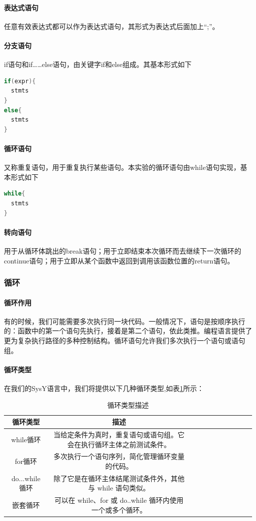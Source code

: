 \documentclass[UTF8,a4paper,10pt]{ctexart}
\begin{document}
\paragraph{表达式语句} 任意有效表达式都可以作为表达式语句，其形式为表达式后面加上“;”。
\paragraph{分支语句} if语句和if……else语句，由关键字if和else组成。其基本形式如下
\begin{lstlisting}[language = c++]
if(expr){
  stmts
}
else{
  stmts
}
\end{lstlisting}
\paragraph{循环语句} 又称重复语句，用于重复执行某些语句。本实验的循环语句由while语句实现，基本形式如下
\begin{lstlisting}[language = c++]
while{
  stmts
}
\end{lstlisting}
\paragraph{转向语句} 用于从循环体跳出的break语句；用于立即结束本次循环而去继续下一次循环的continue语句；用于立即从某个函数中返回到调用该函数位置的return语句。








\subsubsection{循环}
\paragraph{循环作用}
有的时候，我们可能需要多次执行同一块代码。一般情况下，语句是按顺序执行的：函数中的第一个语句先执行，接着是第二个语句，依此类推。编程语言提供了更为复杂执行路径的多种控制结构。循环语句允许我们多次执行一个语句或语句组。


\paragraph{循环类型}
在我们的SysY语言中，我们将提供以下几种循环类型,如表\ref{fig:2}所示：
\newpage
\begin{table}[!htbp]
  \centering
  \begin{tabular}{ccccccccccc}
  \toprule  
  循环类型& 描述&\\
  \midrule
  while循环& 当给定条件为真时，重复语句或语句组。它会在执行循环主体之前测试条件。&\\
  for循环& 多次执行一个语句序列，简化管理循环变量的代码。&\\
  do...while 循环& 除了它是在循环主体结尾测试条件外，其他与 while 语句类似。&\\ 
  嵌套循环& 可以在 while、for 或 do..while 循环内使用一个或多个循环。&\\
  \bottomrule
  \end{tabular}
  \caption{循环类型描述}
  \label{fig:2}
\end{table}
\end{document}
